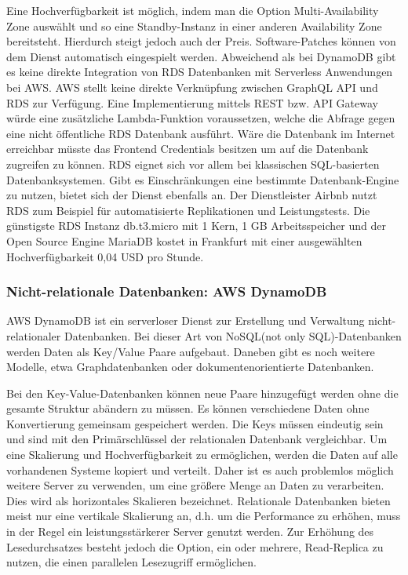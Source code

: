 Eine Hochverfügbarkeit ist möglich, indem man die Option Multi-Availability Zone auswählt und so eine Standby-Instanz in einer anderen Availability Zone bereitsteht.
Hierdurch steigt jedoch auch der Preis. Software-Patches können von dem Dienst automatisch eingespielt werden.
Abweichend als bei DynamoDB gibt es keine direkte Integration von RDS Datenbanken mit Serverless Anwendungen bei AWS.
AWS stellt keine direkte Verknüpfung zwischen GraphQL API und RDS zur Verfügung. Eine Implementierung mittels REST bzw. API Gateway würde eine zusätzliche Lambda-Funktion voraussetzen, welche
die Abfrage gegen eine nicht öffentliche RDS Datenbank ausführt. Wäre die Datenbank im Internet erreichbar müsste das Frontend Credentials besitzen um auf die Datenbank zugreifen zu können.
RDS eignet sich vor allem bei klassischen SQL-basierten Datenbanksystemen. Gibt es Einschränkungen eine bestimmte Datenbank-Engine zu nutzen, bietet sich der Dienst ebenfalls an.
Der Dienstleister Airbnb nutzt RDS zum Beispiel für automatisierte Replikationen und Leistungstests.
Die günstigste RDS Instanz \glqq db.t3.micro\grqq{} mit 1 Kern, 1 GB Arbeitsspeicher und der Open Source Engine MariaDB kostet in Frankfurt mit einer ausgewählten Hochverfügbarkeit 0,04 USD pro Stunde. \cite{RDS}


\subsubsection{Nicht-relationale Datenbanken: AWS DynamoDB}
\label{DynamoDB}

AWS DynamoDB ist ein serverloser Dienst zur Erstellung und Verwaltung nicht-relationaler Datenbanken.
Bei dieser Art von NoSQL(not only SQL)-Datenbanken werden Daten als Key/Value Paare aufgebaut. Daneben gibt es noch weitere Modelle, etwa Graphdatenbanken oder dokumentenorientierte
Datenbanken.

Bei den Key-Value-Datenbanken können neue Paare hinzugefügt werden ohne die gesamte Struktur abändern zu müssen.
Es können verschiedene Daten ohne Konvertierung gemeinsam gespeichert werden.
Die Keys müssen eindeutig sein und sind mit den Primärschlüssel der relationalen Datenbank vergleichbar.
Um eine Skalierung und Hochverfügbarkeit zu ermöglichen, werden die Daten auf alle vorhandenen Systeme kopiert und verteilt. Daher ist es auch problemlos möglich weitere
Server zu verwenden, um eine größere Menge an Daten zu verarbeiten. Dies wird als horizontales Skalieren bezeichnet.
Relationale Datenbanken bieten meist nur eine vertikale Skalierung an, d.h. um die Performance zu erhöhen, muss in der Regel ein leistungsstärkerer Server genutzt werden.
Zur Erhöhung des Lesedurchsatzes besteht jedoch die Option, ein oder mehrere, Read-Replica zu nutzen, die einen parallelen Lesezugriff ermöglichen.


